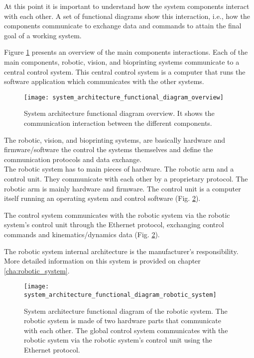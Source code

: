 At this point it is important to understand how the system components interact with each other. A set of functional diagrams show this interaction, i.e., how the components communicate to exchange data and commands to attain the final goal of a working system.

Figure \ref{fig:system_architecture_functional_diagram_overview} presents an overview of the main components interactions. Each of the main components, robotic, vision, and bioprinting systems communicate to a central control system. This central control system is a computer that runs the software application which communicates with the other systems.

\begin{figure}[htbp]
	\centering
	\texttt{[image: system\_architecture\_functional\_diagram\_overview]}
	\caption{System architecture functional diagram overview. It shows the communication interaction between the different components.}
	\label{fig:system_architecture_functional_diagram_overview}
\end{figure}

The robotic, vision, and bioprinting systems, are basically hardware and firmware/software the control the systems themselves and define the communication protocols and data exchange.\\

The robotic system has to main pieces of hardware. The robotic arm and a control unit. They communicate with each other by a proprietary protocol. The robotic arm is mainly hardware and firmware. The control unit is a computer itself running an operating system and control software (Fig. \ref{fig:system_architecture_functional_diagram_robotic_system}).

The control system communicates with the robotic system via the robotic system's control unit through the Ethernet protocol, exchanging control commands and kinematics/dynamics data (Fig. \ref{fig:system_architecture_functional_diagram_robotic_system}).

The robotic system internal architecture is the manufacturer's responsibility. More detailed information on this system is provided on chapter \ref{cha:robotic_system}.

\begin{figure}[htbp]
	\centering
	\texttt{[image: system\_architecture\_functional\_diagram\_robotic\_system]}
	\caption{System architecture functional diagram of the robotic system. The robotic system is made of two hardware parts that communicate with each other. The global control system communicates with the robotic system via the robotic system's control unit using the Ethernet protocol.}
	\label{fig:system_architecture_functional_diagram_robotic_system}
\end{figure}

